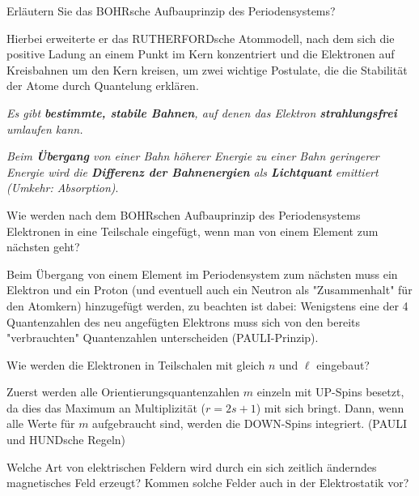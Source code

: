 \documentclass[12pt,a4paper,ngerman]{article}
\begin{document}
\pagebreak

\begin{framed}
Erläutern Sie das BOHRsche Aufbauprinzip des Periodensystems?
\end{framed}

Hierbei erweiterte er das RUTHERFORDsche Atommodell, nach dem sich die positive Ladung an einem Punkt im Kern konzentriert und die Elektronen auf Kreisbahnen um den Kern kreisen, um zwei wichtige Postulate, die die Stabilität der Atome durch Quantelung erklären. \\
\begin{center}
 \textit{Es gibt \textbf{bestimmte, stabile Bahnen}, auf denen das Elektron \textbf{strahlungsfrei} umlaufen kann.}
 \end{center} 
 
 \begin{center}
 \textit{Beim \textbf{Übergang} von einer Bahn höherer Energie zu einer Bahn geringerer Energie wird die \textbf{Differenz der Bahnenergien} als \textbf{Lichtquant} emittiert (Umkehr: Absorption)}. 
 \end{center}



\begin{framed}
Wie werden nach dem BOHRschen Aufbauprinzip des Periodensystems Elektronen in eine Teilschale eingefügt, wenn man von einem Element zum nächsten geht?
\end{framed}

Beim Übergang von einem Element im Periodensystem zum nächsten muss ein Elektron und ein Proton (und eventuell auch ein Neutron als "Zusammenhalt" für den Atomkern) hinzugefügt werden, zu beachten ist dabei: Wenigstens eine der 4 Quantenzahlen des neu angefügten Elektrons muss sich von den bereits "verbrauchten" Quantenzahlen unterscheiden (PAULI-Prinzip). 


\begin{framed}
Wie werden die Elektronen in Teilschalen mit gleich $n$ und $\ell$ eingebaut?
\end{framed}

Zuerst werden alle Orientierungsquantenzahlen $m$ einzeln mit UP-Spins besetzt, da dies das Maximum an Multiplizität ($r = 2s + 1$) mit sich bringt. Dann, wenn alle Werte für $m$ aufgebraucht sind, werden die DOWN-Spins integriert. (PAULI und HUNDsche Regeln)



\begin{framed}
Welche Art von elektrischen Feldern wird durch ein sich zeitlich änderndes magnetisches Feld erzeugt? Kommen solche Felder auch in der Elektrostatik vor?
\end{framed}
\end{document}
